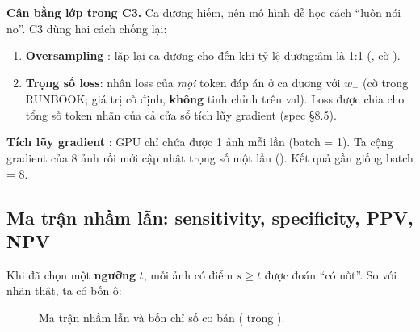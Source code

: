 \textbf{Cân bằng lớp trong C3.} Ca dương hiếm, nên mô hình dễ học cách ``luôn nói no''. C3 dùng hai cách chống lại:
\begin{enumerate}
\item \textbf{Oversampling} : lặp lại ca dương cho đến khi tỷ lệ dương:âm là 1:1 (, cờ ).
\item \textbf{Trọng số loss}: nhân loss của \emph{mọi} token đáp án ở ca dương với $w_+$ (cờ  trong RUNBOOK; giá trị cố định, \textbf{không} tinh chỉnh trên val).
      Loss được chia cho tổng số token nhãn của cả cửa sổ tích lũy gradient (spec §8.5).
\end{enumerate}

\textbf{Tích lũy gradient} : GPU chỉ chứa được 1 ảnh mỗi lần (batch = 1). Ta cộng gradient của 8 ảnh rồi mới
cập nhật trọng số một lần (). Kết quả gần giống batch = 8.

\subsection{Ma trận nhầm lẫn: sensitivity, specificity, PPV, NPV}
\label{sec:confusion}

Khi đã chọn một \textbf{ngưỡng}  $t$, mỗi ảnh có điểm $s \ge t$ được đoán ``có nốt''. So với nhãn thật, ta có bốn ô:

\begin{figure}[H]
\centering
{}
\caption{Ma trận nhầm lẫn  và bốn chỉ số cơ bản ( trong ).}
\label{fig:confusion}
\end{figure}

